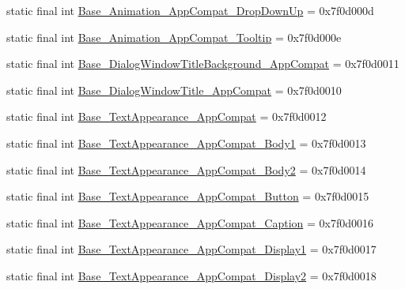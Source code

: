 \begin{DoxyCompactItemize}
\item 
static final int \mbox{\hyperlink{classandroid_1_1support_1_1design_1_1R_1_1style_a5f411ec5e655a9763c28ecfd298e9e8a}{Base\+\_\+\+Animation\+\_\+\+App\+Compat\+\_\+\+Drop\+Down\+Up}} = 0x7f0d000d
\item 
static final int \mbox{\hyperlink{classandroid_1_1support_1_1design_1_1R_1_1style_ae52fcb70895e0c0330cf522a0dc0649c}{Base\+\_\+\+Animation\+\_\+\+App\+Compat\+\_\+\+Tooltip}} = 0x7f0d000e
\item 
static final int \mbox{\hyperlink{classandroid_1_1support_1_1design_1_1R_1_1style_a206a09a3d56b243175ac0425e4861ce9}{Base\+\_\+\+Dialog\+Window\+Title\+Background\+\_\+\+App\+Compat}} = 0x7f0d0011
\item 
static final int \mbox{\hyperlink{classandroid_1_1support_1_1design_1_1R_1_1style_a476f4387fec10156084906d154b6eba6}{Base\+\_\+\+Dialog\+Window\+Title\+\_\+\+App\+Compat}} = 0x7f0d0010
\item 
static final int \mbox{\hyperlink{classandroid_1_1support_1_1design_1_1R_1_1style_ab59a4ce42c1b2e787d54c04c8482593d}{Base\+\_\+\+Text\+Appearance\+\_\+\+App\+Compat}} = 0x7f0d0012
\item 
static final int \mbox{\hyperlink{classandroid_1_1support_1_1design_1_1R_1_1style_a1c720a456a5085382ac584cac0b0bab4}{Base\+\_\+\+Text\+Appearance\+\_\+\+App\+Compat\+\_\+\+Body1}} = 0x7f0d0013
\item 
static final int \mbox{\hyperlink{classandroid_1_1support_1_1design_1_1R_1_1style_a5d5e30cfe76ac49b6714e25e393b07a5}{Base\+\_\+\+Text\+Appearance\+\_\+\+App\+Compat\+\_\+\+Body2}} = 0x7f0d0014
\item 
static final int \mbox{\hyperlink{classandroid_1_1support_1_1design_1_1R_1_1style_a49e39263b4eb37684aba06a6e360201d}{Base\+\_\+\+Text\+Appearance\+\_\+\+App\+Compat\+\_\+\+Button}} = 0x7f0d0015
\item 
static final int \mbox{\hyperlink{classandroid_1_1support_1_1design_1_1R_1_1style_ab01622f4fbc20917df4953bbe0d1c1a7}{Base\+\_\+\+Text\+Appearance\+\_\+\+App\+Compat\+\_\+\+Caption}} = 0x7f0d0016
\item 
static final int \mbox{\hyperlink{classandroid_1_1support_1_1design_1_1R_1_1style_ac11ffe6c88514201d4a71fee6bf6fa1e}{Base\+\_\+\+Text\+Appearance\+\_\+\+App\+Compat\+\_\+\+Display1}} = 0x7f0d0017
\item 
static final int \mbox{\hyperlink{classandroid_1_1support_1_1design_1_1R_1_1style_a6d3af5c10efbdd0fc2b08e2526b2cbb5}{Base\+\_\+\+Text\+Appearance\+\_\+\+App\+Compat\+\_\+\+Display2}} = 0x7f0d0018

\end{DoxyCompactItemize}
